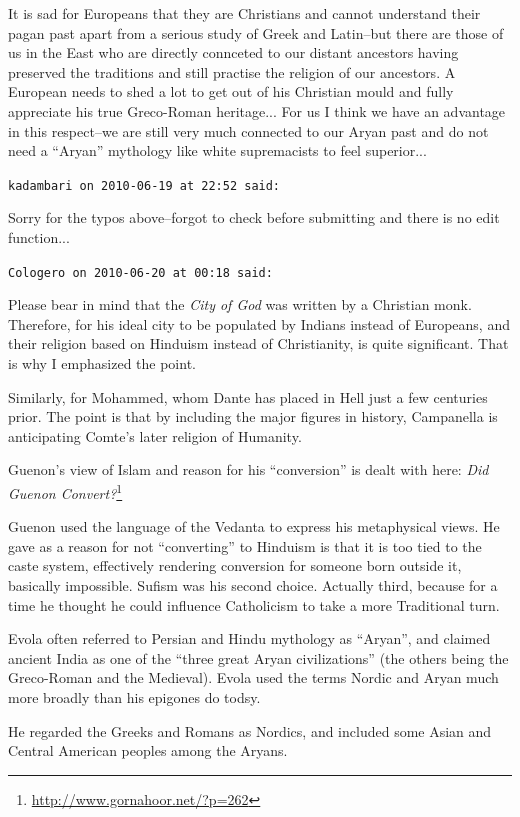 \begin{footnotesize}
\begin{sffamily}
It is sad for Europeans that they are Christians and cannot understand their pagan past apart from a serious study of Greek and Latin--but there are those of us in the East who are directly connceted to our distant ancestors having preserved the traditions and still practise the religion of our ancestors. A European needs to shed a lot to get out of his Christian mould and fully appreciate his true Greco-Roman heritage... For us I think we have an advantage in this respect--we are still very much connected to our Aryan past and do not need a ``Aryan'' mythology like white supremacists to feel superior... \hfill

\texttt{kadambari on 2010-06-19 at 22:52 said:}

Sorry for the typos above--forgot to check before submitting and there is no edit function... \hfill

\texttt{Cologero on 2010-06-20 at 00:18 said:}

Please bear in mind that the \emph{City of God} was written by a Christian monk. Therefore, for his ideal city to be populated by Indians instead of Europeans, and their religion based on Hinduism instead of Christianity, is quite significant. That is why I emphasized the point.

Similarly, for Mohammed, whom Dante has placed in Hell just a few centuries prior. The point is that by including the major figures in history, Campanella is anticipating Comte's later religion of Humanity.

Guenon's view of Islam and reason for his ``conversion'' is dealt with here: \textit{Did Guenon Convert?}\footnote{\url{http://www.gornahoor.net/?p=262}}

Guenon used the language of the Vedanta to express his metaphysical views. He gave as a reason for not ``converting'' to Hinduism is that it is too tied to the caste system, effectively rendering conversion for someone born outside it, basically impossible. Sufism was his second choice. Actually third, because for a time he thought he could influence Catholicism to take a more Traditional turn.

Evola often referred to Persian and Hindu mythology as ``Aryan'', and claimed ancient India as one of the ``three great Aryan civilizations'' (the others being the Greco-Roman and the Medieval). Evola used the terms Nordic and Aryan much more broadly than his epigones do todsy.

He regarded the Greeks and Romans as Nordics, and included some Asian and Central American peoples among the Aryans.


\end{sffamily}
\end{footnotesize}
